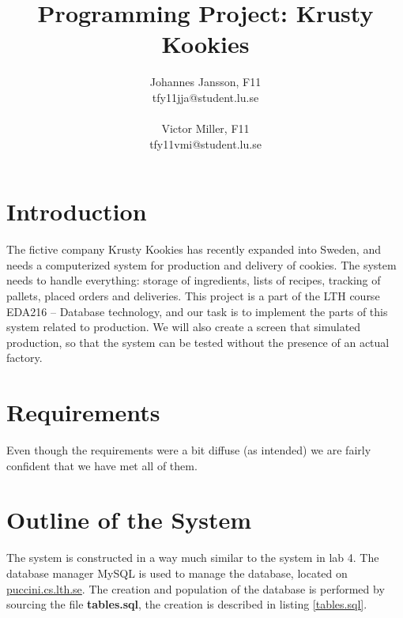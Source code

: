\documentclass[a4paper]{scrartcl}
\numberwithin{equation}{section}
\begin{document}
\title{Programming Project: Krusty Kookies}
\author{Johannes Jansson, F11\\tfy11jja@student.lu.se\\\\Victor Miller, F11\\tfy11vmi@student.lu.se}

\date{}
\maketitle
\newpage

\section*{Introduction}
The fictive company Krusty Kookies has recently expanded into Sweden, and needs a computerized system for production and delivery of cookies. 
The system needs to handle everything: storage of ingredients, lists of recipes, tracking of pallets, placed orders and deliveries. 
This project is a part of the LTH course EDA216 -- Database technology, and our task is to implement the parts of this system related to production.
We will also create a screen that simulated production, so that the system can be tested without the presence of an actual factory.


\section*{Requirements}
Even though the requirements were a bit diffuse (as intended) we are fairly confident that we have met all of them. 
\section*{Outline of the System}
The system is constructed in a way much similar to the system in lab 4. 
The database manager MySQL is used to manage the database, located on \url{puccini.cs.lth.se}. 
The creation and population of the database is performed by sourcing the file \textbf{tables.sql}, the creation is described in listing \ref{tables.sql}.
\end{document}
